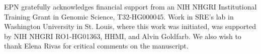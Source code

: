 \documentclass[11pt]{article}
\newif\ifdraft
\begin{document}
EPN gratefully acknowledges financial support from an NIH NHGRI
Institutional Training Grant in Genomic Science, T32-HG000045. Work in
SRE's lab in Washington University in St. Louis, where this work was
initiated, was supported by NIH NHGRI RO1-HG01363, HHMI, and Alvin
Goldfarb. We also wish to thank Elena Rivas for critical comments on
the manuscript.


\newpage
%


\ifdraft
 \relax
\else

\newpage


\newpage


\newpage


\newpage


\newpage


\newpage


\newpage


\newpage


\newpage


\newpage


\newpage

\fi
\end{document}
